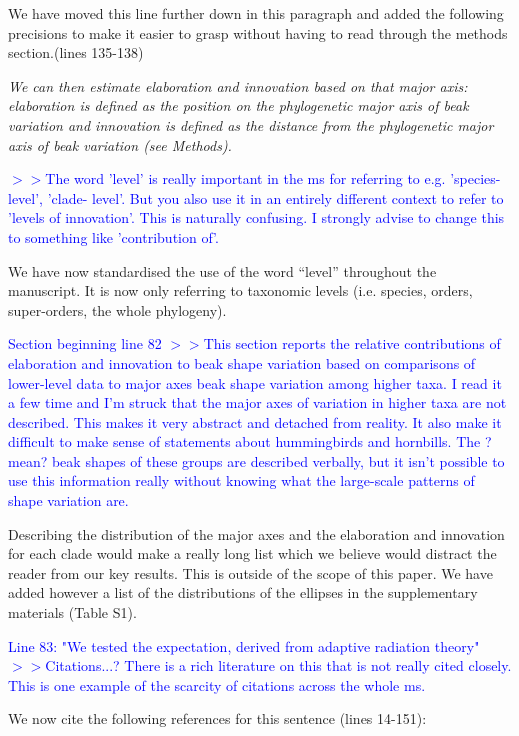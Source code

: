 \documentclass[12pt,letterpaper]{article}
\begin{document}
{We have moved this line further down in this paragraph and added the following precisions to make it easier to grasp without having to read through the methods section.(lines 135-138)

\noindent\textit{We can then estimate elaboration and innovation based on that major axis: elaboration is defined as the position on the phylogenetic major axis of beak variation and innovation is defined as the distance from the phylogenetic major axis of beak variation (see Methods). %
}


\textcolor{blue}{$>>$The word 'level' is really important in the ms for referring to e.g. 'species-level', 'clade- level'. But you also use it in an entirely different context to refer to 'levels of innovation'. This is naturally confusing. I strongly advise to change this to something like 'contribution of'.}

We have now standardised the use of the word “level” throughout the manuscript. It is now only referring to taxonomic levels (i.e. species, orders, super-orders, the whole phylogeny). 

\textcolor{blue}{Section beginning line 82
$>>$This section reports the relative contributions of elaboration and innovation to beak shape variation based on comparisons of lower-level data to major axes beak shape variation among higher taxa. I read it a few time and I'm struck that the major axes of variation in higher taxa are not described. This makes it very abstract and detached from reality. It also make it difficult to make sense of statements about hummingbirds and hornbills. The ?mean? beak shapes of these groups are described verbally, but it isn't possible to use this information really without knowing what the large-scale patterns of shape variation are.}

Describing the distribution of the major axes and the elaboration and innovation for each clade would make a really long list which we believe would distract the reader from our key results. This is outside of the scope of this paper. We have added however a list of the distributions of the ellipses in the supplementary materials (Table S1).

\textcolor{blue}{Line 83: "We tested the expectation, derived from adaptive radiation theory"
$>>$Citations...? There is a rich literature on this that is not really cited closely. This is one example of the scarcity of citations across the whole ms.}

We now cite the following references for this sentence (lines 14-151):

}
\end{document}
